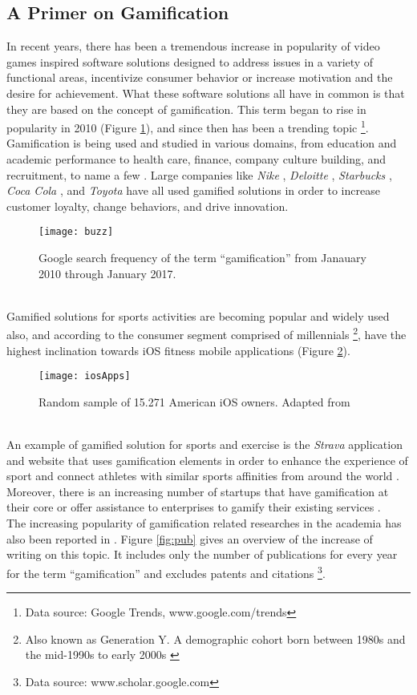 \subsection{A Primer on Gamification}
In recent years, there has been a tremendous increase in popularity of video games inspired software solutions designed to address issues in a variety of functional areas, incentivize consumer behavior or increase motivation and the desire for achievement. What these software solutions all have in common is that they are based on the concept of gamification. This term began to rise in popularity in 2010 (Figure \ref{fig:buzz}), and since then has been a trending topic \footnote{Data source: Google Trends, www.google.com/trends}. Gamification is being used and studied in various domains, from education and academic performance to health care, finance, company culture building, and recruitment, to name a few \cite{gamificationExamples, gamificationWiki, enterpriseGamify}. Large companies like \textit{Nike} \cite{nikePlus}, \textit{Deloitte} \cite{deloitte}, \textit{Starbucks} \cite{starbucks}, \textit{Coca Cola} \cite{coke}, and \textit{Toyota} \cite{toyota} have all used gamified solutions in order to increase customer loyalty, change behaviors, and drive innovation. \pagebreak 
\begin{figure}[h]
    \centering
    \texttt{[image: buzz]}
    \caption{Google search frequency of the term ``gamification'' from Janauary 2010 through January 2017.}
    \label{fig:buzz}
\end{figure}\\
Gamified solutions for sports activities are becoming popular and widely used also, and according to \cite{iosPopulatity} the consumer segment comprised of millennials \footnote{Also known as Generation Y. A demographic cohort born between 1980s and the mid-1990s to early 2000s \cite{mill}}, have the highest inclination towards iOS fitness mobile applications (Figure \ref{fig:iosApps}). 
\begin{figure}[h]
    \centering
    \texttt{[image: iosApps]}
    \caption{Random sample of 15.271 American iOS owners. Adapted from \cite{iosPopulatity}}
    \label{fig:iosApps}
\end{figure}\\
An example of gamified solution for sports and exercise is the \textit{Strava} application and website that uses gamification elements in order to enhance the experience of sport and connect athletes with similar sports affinities from around the world \cite{strava}. Moreover, there is an increasing number of startups \cite{foursquare, codeacademy} that have gamification at their core or offer assistance to enterprises to gamify their existing services \cite{badgeville}. \\The increasing popularity of gamification related researches in the academia has also been reported in \cite{hamari2014does}. Figure \ref{fig:pub} gives an overview of the increase of writing on this topic. It includes only the number of publications for every year for the term ``gamification'' and excludes patents and citations \footnote{Data source: www.scholar.google.com}. 
